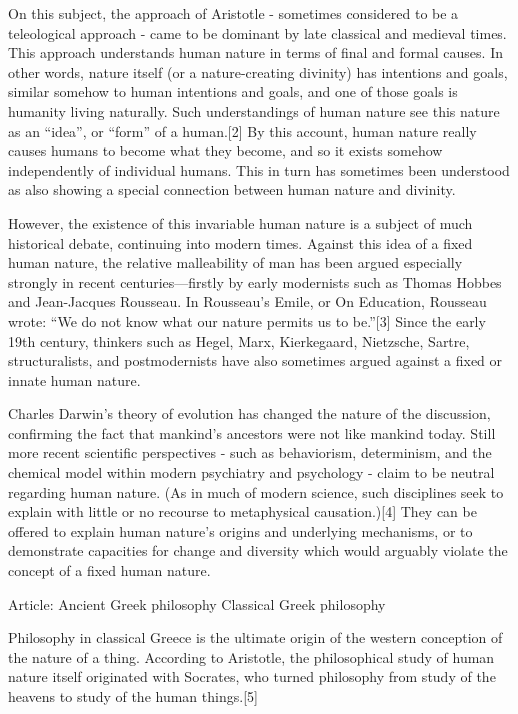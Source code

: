 On this subject, the approach of Aristotle - sometimes considered to be a teleological approach - came to be dominant by late classical and medieval times. This approach understands human nature in terms of final and formal causes. In other words, nature itself (or a nature-creating divinity) has intentions and goals, similar somehow to human intentions and goals, and one of those goals is humanity living naturally. Such understandings of human nature see this nature as an ``idea'', or ``form'' of a human.[2] By this account, human nature really causes humans to become what they become, and so it exists somehow independently of individual humans. This in turn has sometimes been understood as also showing a special connection between human nature and divinity.

However, the existence of this invariable human nature is a subject of much historical debate, continuing into modern times. Against this idea of a fixed human nature, the relative malleability of man has been argued especially strongly in recent centuries—firstly by early modernists such as Thomas Hobbes and Jean-Jacques Rousseau. In Rousseau's Emile, or On Education, Rousseau wrote: ``We do not know what our nature permits us to be.''[3] Since the early 19th century, thinkers such as Hegel, Marx, Kierkegaard, Nietzsche, Sartre, structuralists, and postmodernists have also sometimes argued against a fixed or innate human nature.

Charles Darwin's theory of evolution has changed the nature of the discussion, confirming the fact that mankind's ancestors were not like mankind today. Still more recent scientific perspectives - such as behaviorism, determinism, and the chemical model within modern psychiatry and psychology - claim to be neutral regarding human nature. (As in much of modern science, such disciplines seek to explain with little or no recourse to metaphysical causation.)[4] They can be offered to explain human nature's origins and underlying mechanisms, or to demonstrate capacities for change and diversity which would arguably violate the concept of a fixed human nature.

Article: Ancient Greek philosophy Classical Greek philosophy

Philosophy in classical Greece is the ultimate origin of the western conception of the nature of a thing. According to Aristotle, the philosophical study of human nature itself originated with Socrates, who turned philosophy from study of the heavens to study of the human things.[5] 

